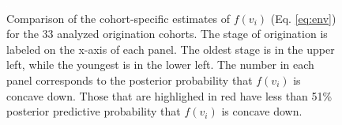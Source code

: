 \documentclass{article}
\begin{document}
\begin{figure}
  \centering
  \includegraphics[height = 0.5\textheight,width=\textwidth,keepaspectratio=true]{figure/cohort_quads}
  \caption{Comparison of the cohort-specific estimates of \(f(v_{i})\) (Eq. \ref{eq:env}) for the 33 analyzed origination cohorts. The stage of origination is labeled on the x-axis of each panel. The oldest stage is in the upper left, while the youngest is in the lower left. The number in each panel corresponds to the posterior probability that \(f(v_{i})\) is concave down. Those that are highlighed in red have less than 51\% posterior predictive probability that \(f(v_{i})\) is concave down.}
  \label{fig:env_cohort}
\end{figure}
\end{document}
